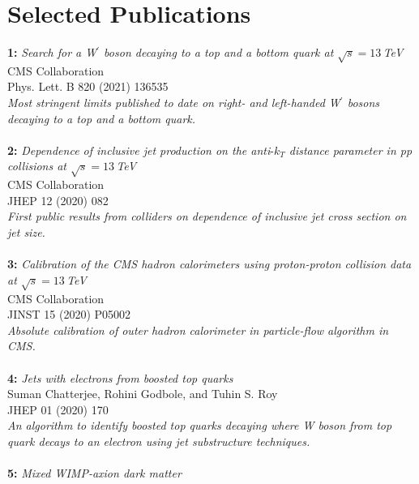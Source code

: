 \documentclass[a4paper,11pt]{article}
\begin{document}
{\newpage

\section*{{Selected Publications}}

\textbf{1:} \textit{
Search for a W$^\prime$ boson decaying to a top and a bottom quark at $\sqrt{s}=13$\,TeV}\\
CMS Collaboration \\
Phys. Lett. B 820 (2021) 136535 \\
\textit{Most stringent limits published to date on right- and left-handed W$^\prime$ bosons decaying to a top and a bottom quark.}\\
\\
\textbf{2:} \textit{
Dependence of inclusive jet production on the anti$\mbox{-}k_T$ distance parameter in pp collisions at $\sqrt{s} = 13$\,TeV}\\
CMS Collaboration \\
JHEP 12 (2020) 082\\
\textit{First public results from colliders on dependence of inclusive jet cross section on jet size.}\\
\\
\textbf{3:} \textit{Calibration of the CMS hadron calorimeters using proton-proton collision data at $\sqrt{s}= 13$\,TeV}\\
CMS Collaboration \\
JINST 15 (2020) P05002\\
\textit{Absolute calibration of outer hadron calorimeter in particle-flow algorithm in CMS.}\\
\\
\textbf{4:} \textit{Jets with electrons from boosted top quarks}\\
Suman Chatterjee, Rohini Godbole, and Tuhin S. Roy\\
JHEP 01 (2020) 170\\
\textit{An algorithm to identify boosted top quarks decaying where W boson from top quark decays to an electron using jet substructure techniques.}\\
\\
\textbf{5:} \textit{Mixed WIMP-axion dark matter}\\
}
\end{document}
